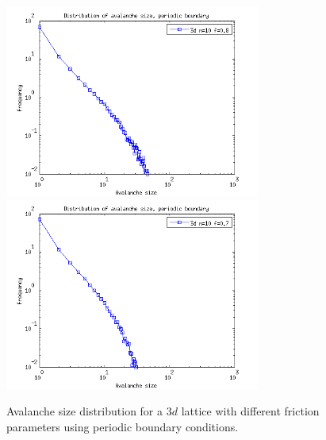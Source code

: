 \begin{figure}
\begin{center}
\includegraphics[width=0.75\textwidth]{results/3spf08.png}
\includegraphics[width=0.75\textwidth]{results/3spf07.png}
\caption{Avalanche size distribution for a $3d$ lattice with different friction parameters using periodic boundary conditions. }
\label{3spf}
\end{center}
\end{figure}


